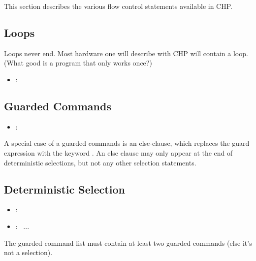 This section describes the various flow control statements available in CHP.  

\subsection{Loops}
\label{sec:chp:flow:loop}

Loops never end.  
Most hardware one will describe with CHP will contain a loop.  
(What good is a program that only works once?)

\begin{itemize}
\item {} : \chpbeginloop\  \chpendloop
\end{itemize}

\subsection{Guarded Commands}
\label{sec:chp:flow:guardedcmd}

\begin{itemize}
\item {} :  \prsrarrow\ 
\end{itemize}

A special case of a guarded commands is an else-clause, 
which replaces the guard expression with the keyword .  
An else clause may only appear at the end of deterministic selections, 
but not any other selection statements.  

\subsection{Deterministic Selection}
\label{sec:chp:flow:detsel}

\begin{itemize}
\item {} :
	\lbracket\  \rbracket
\item {} :
	 \thickbar\ ...
\end{itemize}

The guarded command list must contain at least two guarded commands
(else it's not a selection).  

